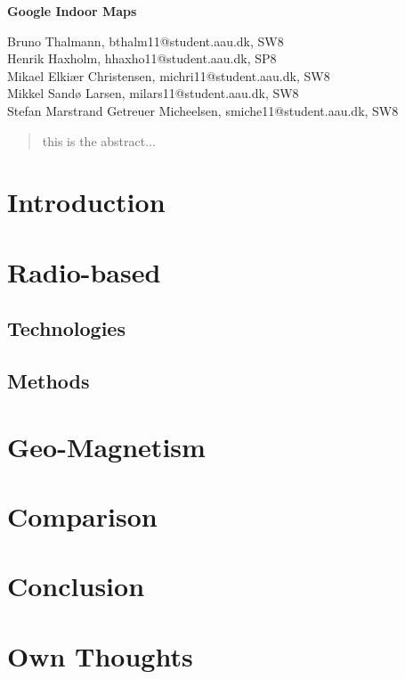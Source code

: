 \documentclass[12pt,a4paper]{article}
\begin{document}
\begin{center}
\bigskip\bigskip
{\Large\bf Google Indoor Maps}
\bigskip\bigskip


Bruno Thalmann, bthalm11@student.aau.dk, SW8\\
Henrik Haxholm, hhaxho11@student.aau.dk, SP8\\
Mikael Elkiær Christensen, michri11@student.aau.dk, SW8\\
Mikkel Sandø Larsen, milars11@student.aau.dk, SW8\\
Stefan Marstrand Getreuer Micheelsen, smiche11@student.aau.dk, SW8

\bigskip
\begin{abstract}
this is the abstract...
\end{abstract}

\thispagestyle{empty}
\end{center}


\titlepage



\thispagestyle{plain}


\section{Introduction}


\section{Radio-based}

\subsection{Technologies}




\subsection{Methods}






\section{Geo-Magnetism}


\section{Comparison}

\section{Conclusion}

\section{Own Thoughts}




\end{document}
